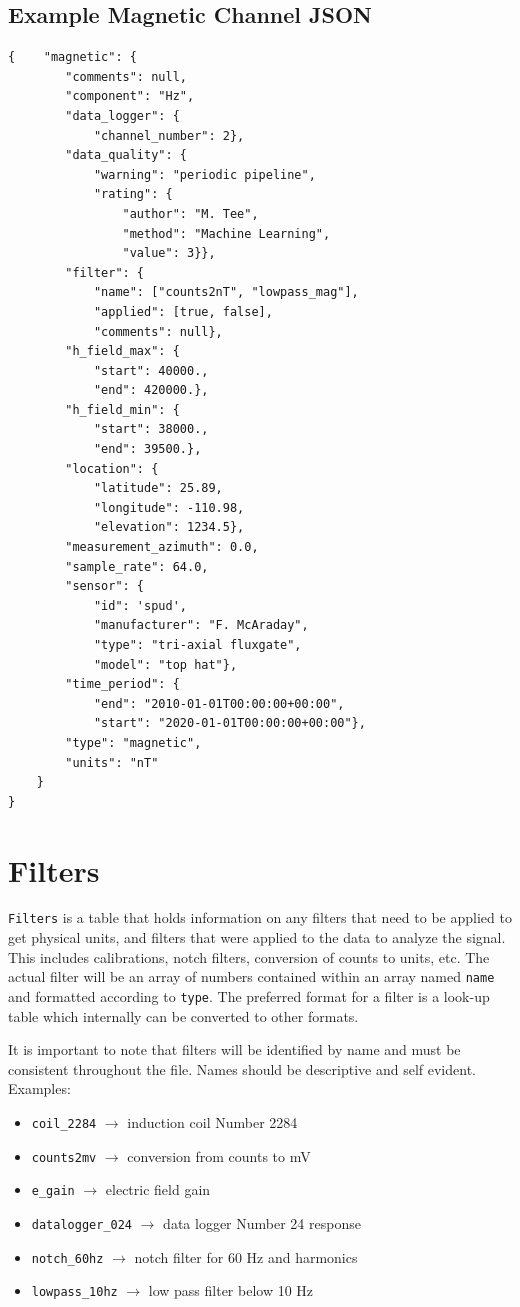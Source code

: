\documentclass[12pt]{article}
\begin{document}
\newpage
\subsection{Example Magnetic Channel JSON}

\begin{verbatim}
{    "magnetic": {
        "comments": null,
        "component": "Hz",
        "data_logger": {
            "channel_number": 2},
        "data_quality": {
            "warning": "periodic pipeline",
            "rating": {
                "author": "M. Tee",
                "method": "Machine Learning",
                "value": 3}},
        "filter": {
            "name": ["counts2nT", "lowpass_mag"],
            "applied": [true, false],
            "comments": null},
        "h_field_max": {
            "start": 40000.,
            "end": 420000.},
        "h_field_min": {
            "start": 38000.,
            "end": 39500.},
        "location": {
            "latitude": 25.89,
            "longitude": -110.98,
            "elevation": 1234.5},
        "measurement_azimuth": 0.0,
        "sample_rate": 64.0,
        "sensor": {
            "id": 'spud',
            "manufacturer": "F. McAraday",
            "type": "tri-axial fluxgate",
            "model": "top hat"},
        "time_period": {
            "end": "2010-01-01T00:00:00+00:00",
            "start": "2020-01-01T00:00:00+00:00"},
        "type": "magnetic",
        "units": "nT"
    }
}
\end{verbatim}

\newpage
\section{Filters}

\verb|Filters| is a table that holds information on any filters that need to be applied to get physical units, and filters that were applied to the data to analyze the signal.  This includes calibrations, notch filters, conversion of counts to units, etc. The actual filter will be an array of numbers contained within an array named \verb|name| and formatted according to \verb|type|. The preferred format for a filter is a look-up table which internally can be converted to other formats. 

It is important to note that filters will be identified by name and must be consistent throughout the file. Names should be descriptive and self evident. Examples:
\begin{itemize}
    \item \verb|coil_2284| $\longrightarrow$ induction coil Number 2284
    \item \verb|counts2mv| $\longrightarrow$ conversion from counts to mV
    \item \verb|e_gain| $\longrightarrow$ electric field gain 
    \item \verb|datalogger_024| $\longrightarrow$ data logger Number 24 response
    \item \verb|notch_60hz| $\longrightarrow$ notch filter for 60 Hz and harmonics
    \item \verb|lowpass_10hz| $\longrightarrow$ low pass filter below 10 Hz
\end{itemize}
\end{document}
